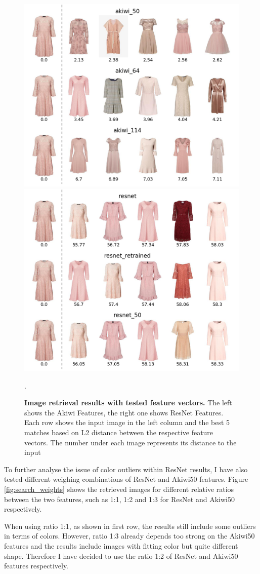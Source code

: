 \documentclass{article}
\begin{document}
\begin{figure}[h]
\centering
{\includegraphics[width=.48\linewidth]{retrieval_exp/akiwi_pink}}\hspace{0.2cm}
{\includegraphics[width=.48\linewidth]{retrieval_exp/resnet_pink}}
\caption{\label{fig:search_pink} \textbf{Image retrieval results with tested feature vectors.} The left shows the Akiwi Features, the right one shows ResNet Features. Each row shows the input image in the left column and the best 5 matches based on L2 distance between the respective feature vectors. The number under each image represents its distance to the input}.
\end{figure}

To further analyse the issue of color outliers within ResNet results, I have also tested different weighing combinations of ResNet and Akiwi50 features. Figure \ref{fig:search_weights} shows the retrieved images for different relative ratios between the two features, such as 1:1, 1:2 and 1:3 for ResNet and Akiwi50 respectively. 

When using ratio 1:1, as shown in first row, the results still include some outliers in terms of colors. However, ratio 1:3 already depends too strong on the Akiwi50 features and the results include images with fitting color but quite different shape. Therefore I have decided to use the ratio 1:2 of ResNet and Akiwi50 features respectively.
\end{document}
